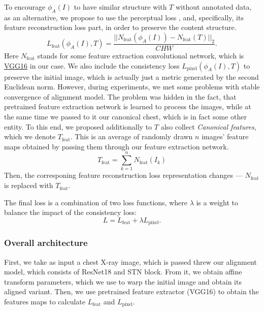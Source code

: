 \documentclass{article}
\begin{document}
To encourage $ \phi_A(I) $ to have similar structure with $ T $ without annotated 
 data, as an alternative, we propose to use the perceptual loss \cite{StyleTransfer},
 and, specifically, its feature reconstruction loss part, in order to preserve the
 content structure.
\begin{equation}
    L_{\text{feat}}(\phi_A(I), T) = \frac{|| N_{\text{feat}}(\phi_A(I)) -
    N_{\text{feat}}(T) ||_2}{CHW}.
\end{equation}
Here $ N_{\text{feat}} $ stands for some feature extraction convolutional network, 
 which is \href{https://pytorch.org/vision/stable/models/generated/torchvision.models.vgg16.html?highlight=vgg}{VGG16} 
 in our case. We also include the consistency loss $ L_{\text{pixel}}(\phi_A(I), T) $ to preserve the
 initial image, which is actually just a metric generated by the second Euclidean norm.
 However, during experiments, we met some problems with stable convergence of 
 alignment model. The problem was hidden in the fact, that pretrained feature 
 extraction network is learned to process the images, while at the same time we 
 passed to it our canonical chest, which is in fact some other entity. To this end,
 we proposed additionally to $ T $ also collect \textit{Canonical features}, which
 we denote $ T_{\text{feat}} $. This is an average of randomly drawn $ n $ images' feature 
 maps obtained by passing them through our feature extraction network.
\begin{equation}
    T_{\text{feat}} = \sum_{k = 1}^{n} N_{\text{feat}}(I_k) 
\end{equation}
Then, the corresponing feature reconstruction loss representation changes --- $N_{\text{feat}}$
is replaced with $T_{\text{feat}}$.

The final loss is a combination of two loss functions, where $ \lambda $ is a weight 
 to balance the impact of the consistency loss:
\begin{equation}
    L = L_{\text{feat}} + \lambda L_{\text{pixel}}.
\end{equation}

\subsubsection{Overall architecture}

First, we take as input a chest X-ray image, which is passed threw our alignment 
model, which consists of ResNet18 and STN block. From it, we obtain affine transform 
parameters, which we use to warp the initial image and obtain its aligned variant. 
Then, we use pretrained feature extractor (VGG16) to obtain the features maps to 
calculate $L_{\text{feat}}$ and $ L_{\text{pixel}} $.
\end{document}
